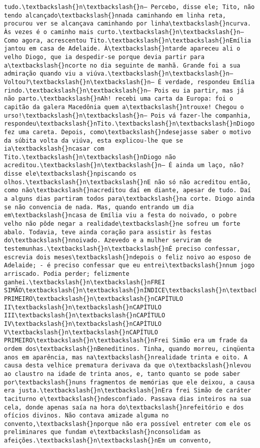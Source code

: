 \documentclass[11pt]{article}
\begin{document}
\begin{Verbatim}[commandchars=\\\{\}]
tudo.\textbackslash{}n\textbackslash{}n— Percebo, disse ele; Tito, não tendo alcançado\textbackslash{}nnada caminhando em linha reta, procurou ver se alcançava caminhando por linha\textbackslash{}ncurva. Às vezes é o caminho mais curto.\textbackslash{}n\textbackslash{}n— Como agora, acrescentou Tito.\textbackslash{}n\textbackslash{}nEmília jantou em casa de Adelaide. À\textbackslash{}ntarde apareceu ali o velho Diogo, que ia despedir-se porque devia partir para a\textbackslash{}ncorte no dia seguinte de manhã. Grande foi a sua admiração quando viu a viúva.\textbackslash{}n\textbackslash{}n— Voltou?\textbackslash{}n\textbackslash{}n— É verdade, respondeu Emília rindo.\textbackslash{}n\textbackslash{}n— Pois eu ia partir, mas já não parto.\textbackslash{}nAh! recebi uma carta da Europa: foi o capitão da galera Macedônia quem a\textbackslash{}ntrouxe! Chegou o urso!\textbackslash{}n\textbackslash{}n— Pois vá fazer-lhe companhia, respondeu\textbackslash{}nTito.\textbackslash{}n\textbackslash{}nDiogo fez uma careta. Depois, como\textbackslash{}ndesejasse saber o motivo da súbita volta da viúva, esta explicou-lhe que se ia\textbackslash{}ncasar com Tito.\textbackslash{}n\textbackslash{}nDiogo não acreditou.\textbackslash{}n\textbackslash{}n— É ainda um laço, não? disse ele\textbackslash{}npiscando os olhos.\textbackslash{}n\textbackslash{}nE não só não acreditou então, como não\textbackslash{}nacreditou daí em diante, apesar de tudo. Daí a alguns dias partiram todos para\textbackslash{}na corte. Diogo ainda se não convencia de nada. Mas, quando entrando um dia em\textbackslash{}ncasa de Emília viu a festa do noivado, o pobre velho não pôde negar a realidade\textbackslash{}ne sofreu um forte abalo. Todavia, teve ainda coração para assistir às festas do\textbackslash{}nnoivado. Azevedo e a mulher serviram de testemunhas.\textbackslash{}n\textbackslash{}nÉ preciso confessar, escrevia dois meses\textbackslash{}ndepois o feliz noivo ao esposo de Adelaide; - é preciso confessar que eu entrei\textbackslash{}nnum jogo arriscado. Podia perder; felizmente ganhei.\textbackslash{}n\textbackslash{}nFREI SIMÃO\textbackslash{}n\textbackslash{}nÍNDICE\textbackslash{}n\textbackslash{}nCAPÍTULO PRIMEIRO\textbackslash{}n\textbackslash{}nCAPÍTULO II\textbackslash{}n\textbackslash{}nCAPÍTULO III\textbackslash{}n\textbackslash{}nCAPÍTULO IV\textbackslash{}n\textbackslash{}nCAPÍTULO V\textbackslash{}n\textbackslash{}nCAPÍTULO PRIMEIRO\textbackslash{}n\textbackslash{}nFrei Simão era um frade da ordem dos\textbackslash{}nBeneditinos. Tinha, quando morreu, cinqüenta anos em aparência, mas na\textbackslash{}nrealidade trinta e oito. A causa desta velhice prematura derivava da que o\textbackslash{}nlevou ao claustro na idade de trinta anos, e, tanto quanto se pode saber por\textbackslash{}nuns fragmentos de memórias que ele deixou, a causa era justa.\textbackslash{}n\textbackslash{}nEra frei Simão de caráter taciturno e\textbackslash{}ndesconfiado. Passava dias inteiros na sua cela, donde apenas saía na hora do\textbackslash{}nrefeitório e dos ofícios divinos. Não contava amizade alguma no convento,\textbackslash{}nporque não era possível entreter com ele os preliminares que fundam e\textbackslash{}nconsolidam as afeições.\textbackslash{}n\textbackslash{}nEm um convento, 
\end{Verbatim}
\end{document}
